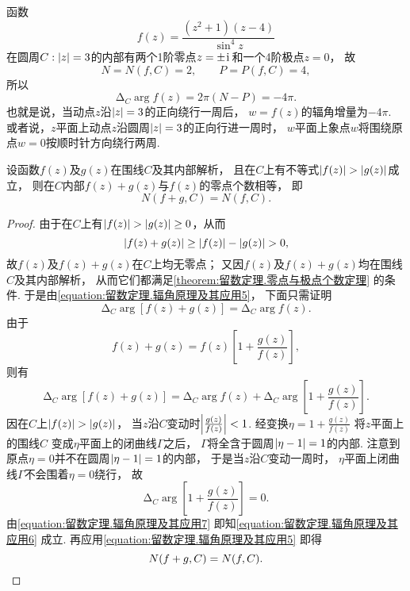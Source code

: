 \begin{example}
函数\[
	f(z) = \frac{(z^2+1)(z-4)}{\sin^4 z}
\]
在圆周\(C: \abs{z}=3\)的内部有两个1阶零点\(z=\pm\kern1pt\mathrm{i}\kern1pt\)和一个4阶极点\(z=0\)，
故\[
	N=N(f,C)=2, \qquad P=P(f,C)=4,
\]
所以\[
	\increment_C \arg f(z) = 2\pi(N - P) = -4\pi.
\]
也就是说，当动点\(z\)沿\(\abs{z}=3\)的正向绕行一周后，
\(w = f(z)\)的辐角增量为\(-4\pi\).
或者说，\(z\)平面上动点\(z\)沿圆周\(\abs{z}=3\)的正向行进一周时，
\(w\)平面上象点\(w\)将围绕原点\(w=0\)按顺时针方向绕行两周.
\end{example}

\begin{theorem}[儒歇定理]
设函数\(f(z)\)及\(g(z)\)在围线\(C\)及其内部解析，
且在\(C\)上有不等式\(\abs{f(z)}>\abs{g(z)}\)成立，
则在\(C\)内部\(f(z)+g(z)\)与\(f(z)\)的零点个数相等，
即\[
	N(f+g,C) = N(f,C).
\]
\begin{proof}
由于在\(C\)上有\(\abs{f(z)}>\abs{g(z)}\geq0\)，从而\[
\abs{f(z)+g(z)}\geq\abs{f(z)}-\abs{g(z)}>0,
\]故\(f(z)\)及\(f(z)+g(z)\)在\(C\)上均无零点；
又因\(f(z)\)及\(f(z)+g(z)\)均在围线\(C\)及其内部解析，
从而它们都满足\cref{theorem:留数定理.零点与极点个数定理} 的条件.
于是由\cref{equation:留数定理.辐角原理及其应用5}，
下面只需证明\begin{equation}\label{equation:留数定理.辐角原理及其应用6}
	\increment_C \arg[f(z)+g(z)] = \increment_C \arg f(z).
\end{equation}
由于\[
	f(z)+g(z) = f(z) \left[1+\frac{g(z)}{f(z)}\right],
\]
则有\begin{equation}\label{equation:留数定理.辐角原理及其应用7}
	\increment_C \arg[f(z)+g(z)]
	= \increment_C \arg f(z)
	+ \increment_C \arg\left[1+\frac{g(z)}{f(z)}\right].
\end{equation}
因在\(C\)上\(\abs{f(z)}>\abs{g(z)}\)，
当\(z\)沿\(C\)变动时\(\abs{\frac{g(z)}{f(z)}}<1\).
经变换\(\eta=1+\frac{g(z)}{f(z)}\)
将\(z\)平面上的围线\(C\)
变成\(\eta\)平面上的闭曲线\(\Gamma\)之后，
\(\Gamma\)将全含于圆周\(\abs{\eta-1}=1\)的内部.
注意到原点\(\eta=0\)并不在圆周\(\abs{\eta-1}=1\)的内部，
于是当\(z\)沿\(C\)变动一周时，
\(\eta\)平面上闭曲线\(\Gamma\)不会围着\(\eta=0\)绕行，
故\[
	\increment_C \arg\left[1+\frac{g(z)}{f(z)}\right] = 0.
\]
由\cref{equation:留数定理.辐角原理及其应用7}
即知\cref{equation:留数定理.辐角原理及其应用6} 成立.
再应用\cref{equation:留数定理.辐角原理及其应用5}
即得\[
	N(f+g,C) = N(f,C).
	\qedhere
\]
\end{proof}
\end{theorem}

